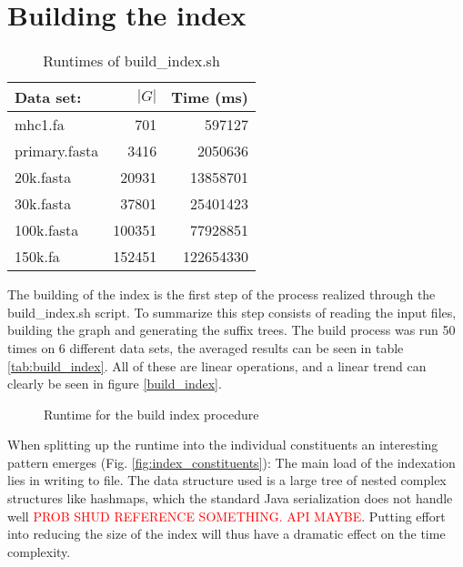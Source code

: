\documentclass[thesis.tex]{subfiles}
\begin{document}
\section{Building the index}
\begin{wraptable}{r}{0.5\textwidth}
  \begin{tabular}{|l|r|r|}
    \hline \textbf{Data set:} & \textbf{$|G|$} & \textbf{Time (ms)}\\ \hline
    mhc1.fa & 701 & 597127\\ \hline
    primary.fasta & 3416 & 2050636\\ \hline
    20k.fasta & 20931 & 13858701\\ \hline
    30k.fasta & 37801 & 25401423\\ \hline
    100k.fasta & 100351 & 77928851\\ \hline
    150k.fa & 152451 & 122654330\\ \hline
  \end{tabular}
  \caption{Runtimes of build\_index.sh}
\end{wraptable}
The building of the index is the first step of the process realized through the build\_index.sh script. To summarize this step consists of reading the input files, building the graph and generating the suffix trees. The build process was run 50 times on 6 different data sets, the averaged results can be seen in table \ref{tab:build_index}. All of these are linear operations, and a linear trend can clearly be seen in figure \ref{build_index}.\\
\begin{figure}[!b]
    \caption{Runtime for the build index procedure}
    \label{fig:build_index}
\end{figure}
\clearpage
\noindent
When splitting up the runtime into the individual constituents an interesting pattern emerges (Fig. \ref{fig:index_constituents}): The main load of the indexation lies in writing to file. The data structure used is a large tree of nested complex structures like hashmaps, which the standard Java serialization does not handle well \textcolor{red}{PROB SHUD REFERENCE SOMETHING. API MAYBE}. Putting effort into reducing the size of the index will thus have a dramatic effect on the time complexity.
\end{document}
